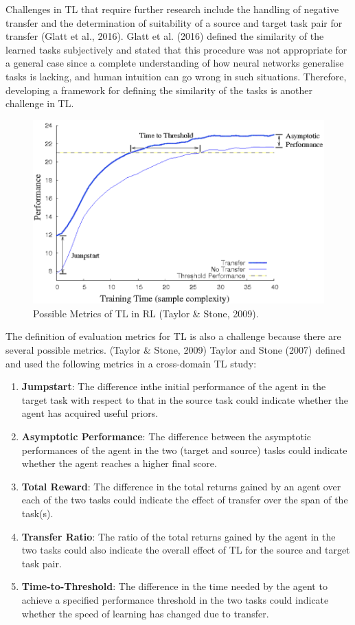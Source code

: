 Challenges in TL that require further research include the handling of negative transfer and the determination of suitability of a source and target task pair for transfer (Glatt et al., 2016). Glatt et al. (2016) defined the similarity of the learned tasks subjectively and stated that this procedure was not appropriate for a general case since a complete understanding of how neural networks generalise tasks is lacking, and human intuition can go wrong in such situations. Therefore, developing a framework for defining the similarity of the tasks is another challenge in TL.

\begin{figure}[]
	\includegraphics[width=\textwidth]{fig3.png} 
	\caption{Possible Metrics of TL in RL (Taylor \& Stone, 2009).}
\end{figure}

The definition of evaluation metrics for TL is also a challenge because there are several possible metrics. (Taylor \& Stone, 2009)
Taylor and Stone (2007) defined and used the following metrics in a cross-domain TL study:
 \begin{enumerate}
	\item \textbf{Jumpstart}: The difference inthe initial performance of the agent in the target task with respect to that in the source task could indicate whether the agent has acquired useful priors.
	\item \textbf{Asymptotic Performance}: The difference between the asymptotic performances of the agent in the two (target and source) tasks could indicate whether the agent reaches a higher final score.
	\item \textbf{Total Reward}: The difference in the total returns gained by an agent over each of the two tasks could indicate the effect of transfer over the span of the task(s).
	\item \textbf{Transfer Ratio}: The ratio of the total returns gained by the agent in the two tasks could also indicate the overall effect of TL for the source and target task pair.
	\item \textbf{Time-to-Threshold}: The difference in the time needed by the agent to achieve a specified performance threshold in the two tasks could indicate whether the speed of learning has changed due to transfer.
\end{enumerate}

